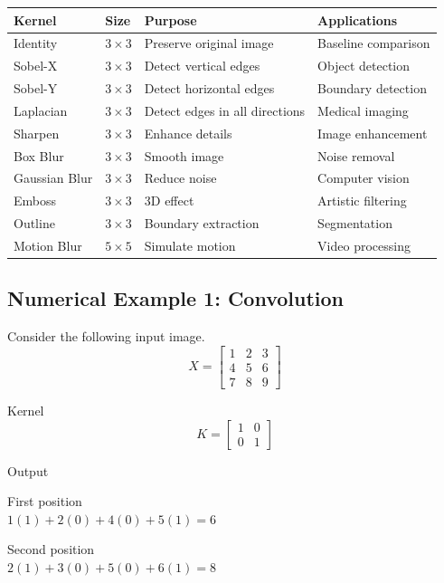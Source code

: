 \documentclass[11pt]{article}
\begin{document}
\begin{center}
\begin{tabular}{|p{2.6cm}|p{1.3cm}|p{5.3cm}|p{5cm}|}
\hline
\textbf{Kernel} & \textbf{Size} & \textbf{Purpose} & \textbf{Applications}\\
\hline
Identity & $3\times3$ & Preserve original image & Baseline comparison\\
\hline
Sobel-X & $3\times3$ & Detect vertical edges & Object detection\\
\hline
Sobel-Y & $3\times3$ & Detect horizontal edges & Boundary detection\\
\hline
Laplacian & $3\times3$ & Detect edges in all directions & Medical imaging\\
\hline
Sharpen & $3\times3$ & Enhance details & Image enhancement\\
\hline
Box Blur & $3\times3$ & Smooth image & Noise removal\\
\hline
Gaussian Blur & $3\times3$ & Reduce noise & Computer vision\\
\hline
Emboss & $3\times3$ & 3D effect & Artistic filtering\\
\hline
Outline & $3\times3$ & Boundary extraction & Segmentation\\
\hline
Motion Blur & $5\times5$ & Simulate motion & Video processing\\
\hline
\end{tabular}
\end{center}

\vspace{4mm}
\subsection*{Numerical Example 1: Convolution}

Consider the following input image.
\[
X=\begin{bmatrix}1&2&3\\4&5&6\\7&8&9\end{bmatrix}
\]

Kernel
\[
K=\begin{bmatrix}1&0\\0&1\end{bmatrix}
\]

Output

First position\\
$1(1)+2(0)+4(0)+5(1)=6$

Second position\\
$2(1)+3(0)+5(0)+6(1)=8$
\end{document}
